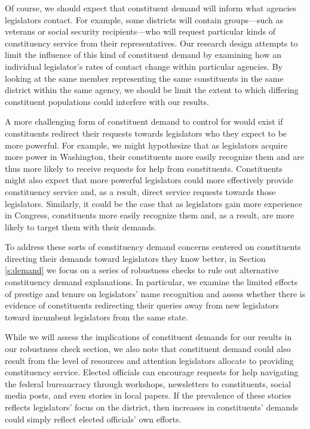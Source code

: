 \documentclass[12pt]{article}
\begin{document}
Of course, we should expect that constituent demand will inform what agencies legislators contact. For example, some districts will contain groups---such as veterans or social security recipients---who will request particular kinds of constituency service from their representatives. Our research design attempts to limit the influence of this kind of constituent demand by examining how an individual legislator's rates of contact change within particular agencies. By looking at the same member representing the same constituents in the same district within the same agency, we should be limit the extent to which differing constituent populations could interfere with our results. 

A more challenging form of constituent demand to control for would exist if constituents redirect their requests towards legislators who they expect to be more powerful. For example, we might hypothesize that as legislators acquire more power in Washington, their constituents more easily recognize them and are thus more likely to receive requests for help from constituents. Constituents might also expect that more powerful legislators could more effectively provide constituency service and, as a result, direct service requests towards those legislators. Similarly, it could be the case that as legislators gain more experience in Congress, constituents more easily recognize them and, as a result, are more likely to target them with their demands. 

To address these sorts of constituency demand concerns centered on constituents directing their demands toward legislators they know better, in Section \ref{s:demand} we focus on a series of robustness checks to rule out alternative constituency demand explanations. In particular, we examine the limited effects of prestige and tenure on legislators' name recognition and assess whether there is evidence of constituents redirecting their queries away from new legislators toward incumbent legislators from the same state. 

While we will assess the implications of constituent demands for our results in our robustness check section, we also note that constituent demand could also result from the level of resources and attention legislators allocate to providing constituency service. Elected officials can encourage requests for help navigating the federal bureaucracy through workshops, newsletters to constituents, social media posts, and even stories in local papers. If the prevalence of these stories reflects legislators' focus on the district, then increases in constituents' demands could simply reflect elected officials' own efforts.  
\end{document}
